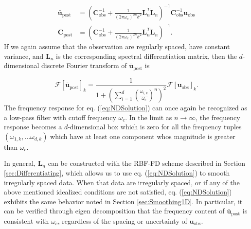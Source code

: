 \documentclass[10pt,a4paper]{article}
\begin{document}
\begin{equation}\label{eq:NDSolution}
\begin{split}
\mathbf{\bar{u}}_\mathrm{post} &= (\mathbf{C}_\mathrm{obs}^{-1} +   
                   \frac{1}{(2\pi\omega_c)^{2n}\bar{\sigma}^2}\mathbf{L}_n^T\mathbf{L}_n)^{-1}\mathbf{C}_\mathrm{obs}^{-1}
                   \mathbf{u}_\mathrm{obs}
\\
\mathbf{C}_\mathrm{post} &= (\mathbf{C}_\mathrm{obs}^{-1} +   
                            \frac{1}{(2\pi\omega_c)^{2n}\bar{\sigma}^2}\mathbf{L}_n^T\mathbf{L}_n)^{-1}.
\end{split}
\end{equation}
If we again assume that the observation are regularly spaced, have constant variance, and $\mathbf{L}_n$ is the corresponding spectral differentiation matrix, then the $d$-dimensional discrete Fourier transform of $\mathbf{\bar{u}}_\mathrm{post}$ is 

\begin{equation}\label{eq:NDFourierSoln}
  \mathcal{F}\left[\mathbf{\bar{u}}_\mathrm{post}\right]_k = 
  \frac{1}{1 + \left(\sum_{i=1}^d \left(\frac{\omega_{i,k}}{\omega_c}\right)^n\right)^2} \mathcal{F}\left[\mathbf{u}_\mathrm{obs}\right]_k.
\end{equation}
The frequency response for eq. (\ref{eq:NDSolution}) can once again be recognized as a low-pass filter with cutoff frequency $\omega_c$.  In the limit as $n \to \infty$, the frequency response becomes a $d$-dimensional box which is zero for all the frequency tuples $(\omega_{1,k},\dots \omega_{d,k})$ which have at least one component whos magnitude is greater than $\omega_c$. 

In general, $\mathbf{L}_n$ can be constructed with the RBF-FD scheme described in Section \ref{sec:Differentiating}, which allows us to use eq. (\ref{eq:NDSolution}) to smooth irregularly spaced data.  When that data are irregularly spaced, or if any of the above mentioned idealized conditions are not satisfied, eq. (\ref{eq:NDSolution}) exhibits the same behavior noted in Section \ref{sec:Smoothing1D}. In particular, it can be verified through eigen decomposition that the frequency content of $\mathbf{\bar{u}}_\mathrm{post}$ is consistent with $\omega_c$, regardless of the spacing or uncertainty of $\mathbf{u}_\mathrm{obs}$.

   
\end{document}
